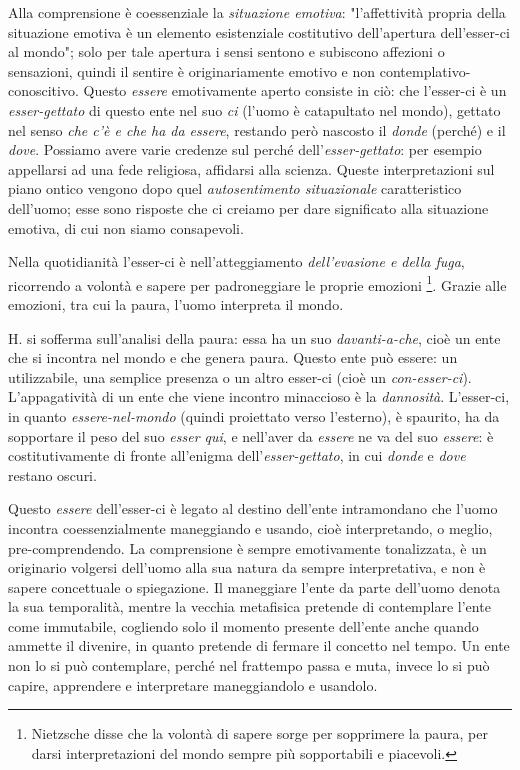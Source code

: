 \documentclass[a4paper,12pt,oneside]{article}%
\begin{document}
Alla comprensione è coessenziale la \textit{situazione emotiva}: "l'affettività propria della situazione emotiva è un elemento esistenziale costitutivo dell'apertura dell'esser-ci al mondo"; solo per tale apertura i sensi sentono e subiscono affezioni o sensazioni, quindi il sentire è originariamente emotivo e non contemplativo-conoscitivo. Questo \textit{essere} emotivamente aperto consiste in ciò: che l'esser-ci è un \textit{esser-gettato} di questo ente nel suo \textit{ci} (l'uomo è catapultato nel mondo), gettato nel senso \textit{che c'è e che ha da essere}, restando però nascosto il \textit{donde} (perché) e il \textit{dove}. Possiamo avere varie credenze sul perché dell'\textit{esser-gettato}: per esempio appellarsi ad una fede religiosa, affidarsi alla scienza. Queste interpretazioni sul piano ontico vengono dopo quel \textit{autosentimento situazionale} caratteristico dell'uomo; esse sono risposte che ci creiamo per dare significato alla situazione emotiva, di cui non siamo consapevoli.

Nella quotidianità l'esser-ci è nell'atteggiamento \textit{dell'evasione e della fuga}, ricorrendo a volontà e sapere per padroneggiare le proprie emozioni \footnote{Nietzsche disse che la volontà di sapere sorge per sopprimere la paura, per darsi interpretazioni del mondo sempre più sopportabili e piacevoli.}. Grazie alle emozioni, tra cui la paura, l'uomo interpreta il mondo.

H. si sofferma sull'analisi della paura: essa ha un suo \textit{davanti-a-che}, cioè un ente che si incontra nel mondo e che genera paura. Questo ente può essere: un utilizzabile, una semplice presenza o un altro esser-ci (cioè un \textit{con-esser-ci}). L'appagatività di un ente che viene incontro minaccioso è la \textit{dannosità}. L'esser-ci, in quanto \textit{essere-nel-mondo} (quindi proiettato verso l'esterno), è spaurito, ha da sopportare il peso del suo \textit{esser qui}, e nell'aver da \textit{essere} ne va del suo \textit{essere}: è costitutivamente di fronte all'enigma dell'\textit{esser-gettato}, in cui \textit{donde} e \textit{dove}  restano oscuri.

Questo \textit{essere} dell'esser-ci è legato al destino dell'ente intramondano che l'uomo incontra coessenzialmente maneggiando e usando, cioè interpretando, o meglio, pre-comprendendo. La comprensione è sempre emotivamente tonalizzata, è un originario volgersi dell'uomo alla sua natura da sempre interpretativa, e non è sapere concettuale o spiegazione. Il maneggiare l'ente da parte dell'uomo denota la sua temporalità, mentre la vecchia metafisica pretende di contemplare l'ente come immutabile, cogliendo solo il momento presente dell'ente anche quando ammette il divenire, in quanto pretende di fermare il concetto nel tempo. Un ente non lo si può contemplare, perché nel frattempo passa e muta, invece lo si può capire, apprendere e interpretare maneggiandolo e usandolo.
\end{document}

